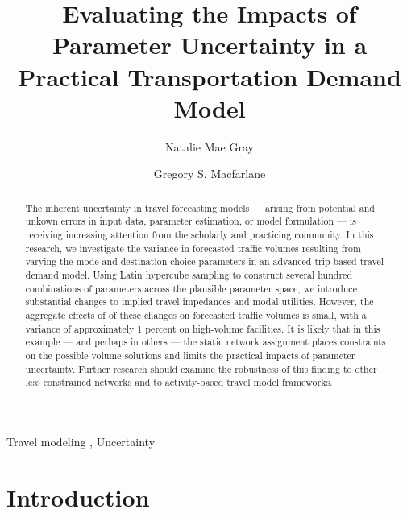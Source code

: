 \documentclass[
  letterpaper,
  number,
  review,
  3p]{elsarticle}
\begin{document}
\begin{frontmatter}
\title{Evaluating the Impacts of Parameter Uncertainty in a Practical
Transportation Demand Model}
\author[1]{Natalie Mae Gray%
%
}
\author[1]{Gregory S. Macfarlane%
%
}




        
\begin{abstract}
The inherent uncertainty in travel forecasting models --- arising from
potential and unkown errors in input data, parameter estimation, or
model formulation --- is receiving increasing attention from the
scholarly and practicing community. In this research, we investigate the
variance in forecasted traffic volumes resulting from varying the mode
and destination choice parameters in an advanced trip-based travel
demand model. Using Latin hypercube sampling to construct several
hundred combinations of parameters across the plausible parameter space,
we introduce substantial changes to implied travel impedances and modal
utilities. However, the aggregate effects of of these changes on
forecasted traffic volumes is small, with a variance of approximately 1
percent on high-volume facilities. It is likely that in this example ---
and perhaps in others --- the static network assignment places
constraints on the possible volume solutions and limits the practical
impacts of parameter uncertainty. Further research should examine the
robustness of this finding to other less constrained networks and to
activity-based travel model frameworks.
\end{abstract}





\begin{keyword}
    Travel modeling \sep 
    Uncertainty
\end{keyword}
\end{frontmatter}
    


\section{Introduction}\label{introduction}
\end{document}
